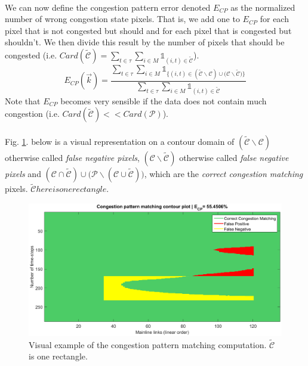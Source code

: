 \\
We can now define the congestion pattern error denoted $E_{CP}$ as the normalized number of wrong congestion state pixels. That is, we add one to $E_{CP}$ for each pixel that is not congested but should and for each pixel that is congested but shouldn't. We then divide this result by the number of pixels that should be congested (i.e. $Card(\widetilde{\mathscr{C}})=\sum_{t\in{\tau}}\sum_{i\in{M}}\mathds{1}_{(i,t)\in{\widetilde{\mathscr{C}}}}$).
\begin{equation*}
	E_{CP}(\vec{k})=\frac{\sum_{t\in{\tau}}\sum_{i\in{M}}\mathds{1}_{\{(i,t)\in{(\widetilde{\mathscr{C}}\backslash \mathscr{C})\cup(\mathscr{C}\backslash \widetilde{\mathscr{C}} })\}}}{\sum_{t\in{\tau}}\sum_{i\in{M}}\mathds{1}_{(i,t)\in{\widetilde{\mathscr{C}}}}}
\end{equation*}
Note that $E_{CP}$ becomes very sensible if the data does not contain much congestion (i.e. $Card(\widetilde{\mathscr{C}})<<Card(\mathscr{P})$).\\
\\
Fig. \ref{fig:cp_example}. below is a visual representation on a contour domain of $(\widetilde{\mathscr{C}}\backslash \mathscr{C})$ otherwise called \emph{false negative pixels}, $(\mathscr{C}\backslash\widetilde{\mathscr{C}})$ otherwise called \emph{false negative pixels} and $(\mathscr{C}\cap\widetilde{\mathscr{C}})\cup \big(\mathscr{P}\backslash(\mathscr{C}\cup \widetilde{\mathscr{C}})\big)$, which are the \emph{correct congestion matching} pixels. $\widetilde{\mathscr{C}} here is one rectangle.$
\begin{figure}[h]
	\caption{Visual example of the congestion pattern matching computation. $\widetilde{\mathscr{C}}$ is one rectangle.}
	\label{fig:cp_example}
	\includegraphics[width=7in]{figures/cp_example.png}
\end{figure}
